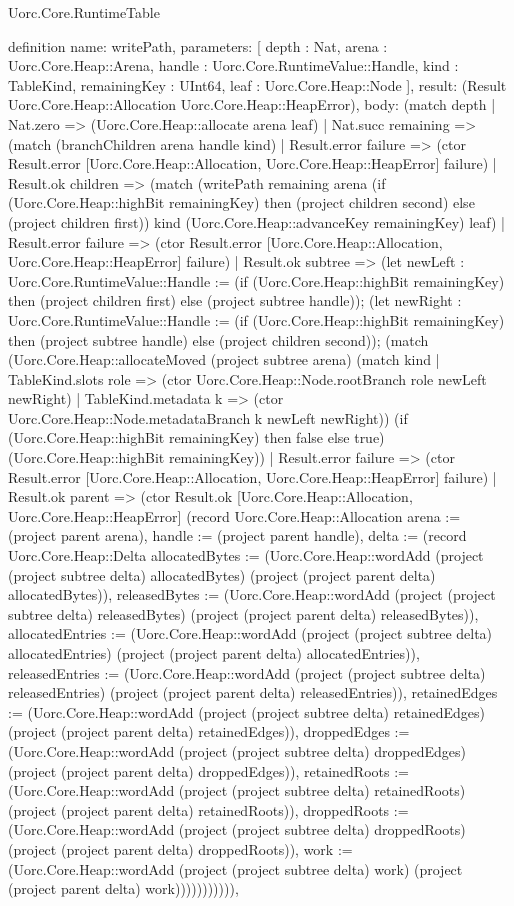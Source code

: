 \begin{lexlean}{Uorc.Core.RuntimeTable}
\begin{semanticmodule}
definition{
  name: writePath,
  parameters: [
    depth : Nat,
    arena : Uorc.Core.Heap::Arena,
    handle : Uorc.Core.RuntimeValue::Handle,
    kind : TableKind,
    remainingKey : UInt64,
    leaf : Uorc.Core.Heap::Node
  ],
  result: (Result Uorc.Core.Heap::Allocation Uorc.Core.Heap::HeapError),
  body: (match depth
    | Nat.zero => (Uorc.Core.Heap::allocate arena leaf)
    | Nat.succ remaining => (match (branchChildren arena handle kind)
      | Result.error failure => (ctor Result.error [Uorc.Core.Heap::Allocation, Uorc.Core.Heap::HeapError] failure)
      | Result.ok children => (match (writePath remaining arena (if (Uorc.Core.Heap::highBit remainingKey) then (project children second) else (project children first)) kind (Uorc.Core.Heap::advanceKey remainingKey) leaf)
        | Result.error failure => (ctor Result.error [Uorc.Core.Heap::Allocation, Uorc.Core.Heap::HeapError] failure)
        | Result.ok subtree => (let newLeft : Uorc.Core.RuntimeValue::Handle := (if (Uorc.Core.Heap::highBit remainingKey) then (project children first) else (project subtree handle)); (let newRight : Uorc.Core.RuntimeValue::Handle := (if (Uorc.Core.Heap::highBit remainingKey) then (project subtree handle) else (project children second)); (match (Uorc.Core.Heap::allocateMoved (project subtree arena) (match kind
            | TableKind.slots role => (ctor Uorc.Core.Heap::Node.rootBranch role newLeft newRight)
            | TableKind.metadata k => (ctor Uorc.Core.Heap::Node.metadataBranch k newLeft newRight)) (if (Uorc.Core.Heap::highBit remainingKey) then false else true) (Uorc.Core.Heap::highBit remainingKey))
          | Result.error failure => (ctor Result.error [Uorc.Core.Heap::Allocation, Uorc.Core.Heap::HeapError] failure)
          | Result.ok parent => (ctor Result.ok [Uorc.Core.Heap::Allocation, Uorc.Core.Heap::HeapError] (record Uorc.Core.Heap::Allocation {arena := (project parent arena), handle := (project parent handle), delta := (record Uorc.Core.Heap::Delta {allocatedBytes := (Uorc.Core.Heap::wordAdd (project (project subtree delta) allocatedBytes) (project (project parent delta) allocatedBytes)), releasedBytes := (Uorc.Core.Heap::wordAdd (project (project subtree delta) releasedBytes) (project (project parent delta) releasedBytes)), allocatedEntries := (Uorc.Core.Heap::wordAdd (project (project subtree delta) allocatedEntries) (project (project parent delta) allocatedEntries)), releasedEntries := (Uorc.Core.Heap::wordAdd (project (project subtree delta) releasedEntries) (project (project parent delta) releasedEntries)), retainedEdges := (Uorc.Core.Heap::wordAdd (project (project subtree delta) retainedEdges) (project (project parent delta) retainedEdges)), droppedEdges := (Uorc.Core.Heap::wordAdd (project (project subtree delta) droppedEdges) (project (project parent delta) droppedEdges)), retainedRoots := (Uorc.Core.Heap::wordAdd (project (project subtree delta) retainedRoots) (project (project parent delta) retainedRoots)), droppedRoots := (Uorc.Core.Heap::wordAdd (project (project subtree delta) droppedRoots) (project (project parent delta) droppedRoots)), work := (Uorc.Core.Heap::wordAdd (project (project subtree delta) work) (project (project parent delta) work))})})))))))),
}
\end{semanticmodule}
\end{lexlean}
